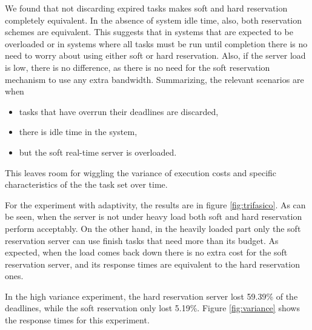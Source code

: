 \documentclass[times, 10pt,twocolumn]{article}
\begin{document}
We found that not discarding expired tasks makes soft and hard
reservation completely equivalent. In the absence of system idle time,
also, both reservation schemes are equivalent. This suggests that in
systems that are expected to be overloaded or in systems where all
tasks must be run until completion there is no need to worry about
using either soft or hard reservation. Also, if the server load is
low, there is no difference, as there is no need for the soft
reservation mechanism to use any extra bandwidth. Summarizing, the
relevant scenarios are when
\begin{itemize}
\item tasks that have overrun their deadlines are discarded,
\item there is idle time in the system,
\item but the soft real-time server is overloaded.
\end{itemize}
This leaves room for wiggling the variance of execution costs and
specific characteristics of the the task set over time.

\begin{figure*}[t]
  \centering
  \caption{Response times for the costs in figure
    \ref{fig:costs-trifasico}.}
  \label{fig:trifasico}
\end{figure*}

For the experiment with adaptivity, the results are in figure
\ref{fig:trifasico}. As can be seen, when the server is not under
heavy load both soft and hard reservation perform acceptably. On the
other hand, in the heavily loaded part only the soft reservation
server can use finish tasks that need more than its budget. As
expected, when the load comes back down there is no extra cost for the
soft reservation server, and its response times are equivalent to the
hard reservation ones.

\begin{figure*}[t]
  \centering
  \caption{Response times for the high variance case.}
  \label{fig:variance}
\end{figure*}


In the high variance experiment, the hard reservation server lost
59.39\% of the deadlines, while the soft reservation only lost
5.19\%. Figure \ref{fig:variance} shows the response times for this
experiment.
\end{document}
